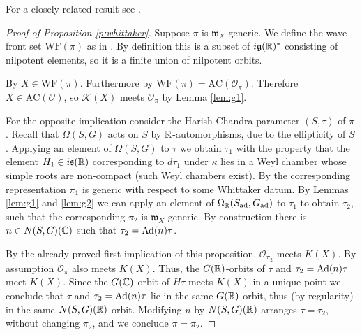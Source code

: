 \documentclass{article}
\theoremstyle{definition}
\numberwithin{equation}{section}
\renewcommand{\-}{\hyp{}}
\newcommand{\warn}[1]{{\leavevmode\color{red}[#1]}}
\newcommand{\g}{\mathfrak g}
\renewcommand{\O}{\mathcal O}
\newcommand{\K}{\mathcal K}
\newcommand{\w}{\mathfrak w}
\newcommand{\WF}{\mathrm{WF}}
\newcommand{\AC}{\mathrm{AC}}
\begin{document}
For a closely related result see \cite[Proposition 3.5]{fm}.
  
\begin{proof}[Proof of Proposition \ref{p:whittaker}]

Suppose $\pi$ is $\w_X$-generic.
We define the wave-front set $\WF(\pi)$ as in \cite[Section 3]{matumoto}. By definition this is a subset of $i\g(\R)^*$ consisting of nilpotent elements,
so it is a finite union of nilpotent orbits.

By \cite[Theorem A]{matumoto}  $X\in \WF(\pi)$. 
Furthermore  by \cite[Theorem 1.2]{harris} $\WF(\pi)=\AC(\O_\pi)$.
Therefore  $X\in \AC(\O)$, so  $\K(X)$ meets $\O_\pi$ by 
Lemma \ref{lem:g1}.

For the opposite implication consider the Harish-Chandra parameter $(S,\tau)$ of $\pi$. Recall that $\Omega(S,G)$ acts on $S$ by $\mathbb{R}$-automorphisms, due to the ellipticity of $S$. Applying an element of $\Omega(S,G)$ to $\tau$ we obtain $\tau_1$ with the property that the element $H_1 \in i\mathfrak{s}(\mathbb{R})$ corresponding to $d\tau_1$ under $\kappa$ lies in a Weyl chamber whose simple roots are non-compact (such Weyl chambers exist). By \cite[Theorem 6.2(a,f)]{Vog78} the corresponding representation $\pi_1$ is generic with respect to some Whittaker datum. By Lemmas \ref{lem:g1} and \ref{lem:g2} we can apply an element of $\Omega_{\mathbb{R}}(S_{\textrm{ad}},G_{\textrm{ad}})$ to $\tau_1$ to obtain $\tau_2$, such that the corresponding $\pi_2$ is $\w_X$-generic. By construction there is $n \in N(S,G)(\mathbb{C})$ such that $\tau_2=\textrm{Ad}(n)\tau$.

By the already proved first implication of this proposition,
$\O_{\pi_2}$ meets $K(X)$. By assumption $\O_\pi$ also meets
$K(X)$. Thus, the $G(\mathbb{R})$-orbits of $\tau$ and
$\tau_2=\textrm{Ad}(n)\tau$ meet $K(X)$. Since the $G(\mathbb{C})$-orbit of
$H\tau$ meets $K(X)$ in a unique point we conclude that $\tau$
and $\tau_2=\textrm{Ad}(n)\tau$ lie in the same $G(\mathbb{R})$-orbit,
thus (by regularity) in the same $N(S,G)(\mathbb{R})$-orbit. Modifying $n$ by
$N(S,G)(\mathbb{R})$ arranges $\tau=\tau_2$,
without changing $\pi_2$, and we conclude $\pi=\pi_2$.
%
\end{proof}
\end{document}
